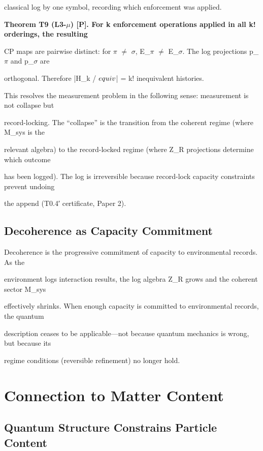 \documentclass[11pt]{article}
\begin{document}
classical log by one symbol, recording which enforcement was applied.



\textbf{Theorem T9 (L3-$\mu$) [P]. For k enforcement operations applied in all k! orderings, the resulting}

CP maps are pairwise distinct: for $\pi$ $\neq$ $\sigma$, E_$\pi$ $\neq$ E_$\sigma$. The log projections p_$\pi$ and p_$\sigma$ are

orthogonal. Therefore |H_k / $\\equiv$| = k! inequivalent histories.



This resolves the measurement problem in the following sense: measurement is not collapse but

record-locking. The “collapse” is the transition from the coherent regime (where M_sys is the

relevant algebra) to the record-locked regime (where Z_R projections determine which outcome

has been logged). The log is irreversible because record-lock capacity constraints prevent undoing

the append (T0.4′ certificate, Paper 2).



\subsection{Decoherence as Capacity Commitment}

Decoherence is the progressive commitment of capacity to environmental records. As the

environment logs interaction results, the log algebra Z_R grows and the coherent sector M_sys

effectively shrinks. When enough capacity is committed to environmental records, the quantum

description ceases to be applicable---not because quantum mechanics is wrong, but because its

regime conditions (reversible refinement) no longer hold.



\section{Connection to Matter Content}



\subsection{Quantum Structure Constrains Particle Content}
\end{document}
